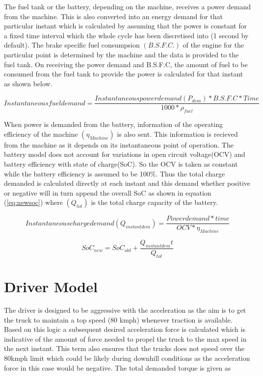 \documentclass[ExampleMasters.tex]{subfiles}
\begin{document}
The fuel tank or the battery, depending on the machine, receives a power demand from the machine. This is also converted into an energy demand for that particular instant which is calculated by assuming that the power is constant for a fixed time interval which the whole cycle has been discretised into (1 second by default). The brake specific fuel consumpsion $(B.S.F.C.)$ of the engine for the particular point is determined by the machine and the data is provided to the fuel tank.  On receiving the power demand and B.S.F.C, the amount of fuel to be consumed from the fuel tank to provide the power is calculated for that instant as shown below.

\begin{equation} \label{eq:fueldem}
Instantaneous fuel demand=\frac{Instantaneous power demand(P_{dem}) * B.S.F.C * Time}{1000*\rho_{fuel}}
\end{equation}

When power is demanded from the battery, information of the operating efficiency of the machine $(\eta_{Machine})$  is also sent. This information is recieved from the machine as it depends on its instantaneous point of operation. The battery model does not account for variations in open circuit voltage(OCV) and battery efficiency with state of charge(SoC). So the OCV is taken as constant while the battery efficiency is assumed to be 100\%. Thus the total charge demanded is calculated directly at each instant and this demand whether positive or negative will in turn append the overall SoC as shown in equation (\ref{eq:newsoc}) where $(Q_{tot})$ is the total charge capacity of the battery.

\begin{equation} \label{eq:instantchargedem}
Instantaneous charge demand(Q_{instant dem}) =\frac{Power demand * time}{OCV * \eta_{Machine} }
\end{equation}

\begin{equation} \label{eq:newsoc}
SoC_{new} =SoC_{old}+ \frac{Q_{instant dem}t}{Q_{tot}}
\end{equation}

\section{Driver Model}
\label{sec:drivermodel}

The driver is designed to be aggressive with the acceleration as the aim is to get the truck to maintain a top speed (80 kmph) whenever traction is available. Based on this logic a subsequent desired acceleration force is calculated which is indicative of the amount of force needed to propel the truck to the max speed in the next instant. This term also ensures that the trucks does not speed over the 80kmph limit which could be likely during downhill conditions as the acceleration force in this case would be negative. The total demanded torque is given as
\end{document}

